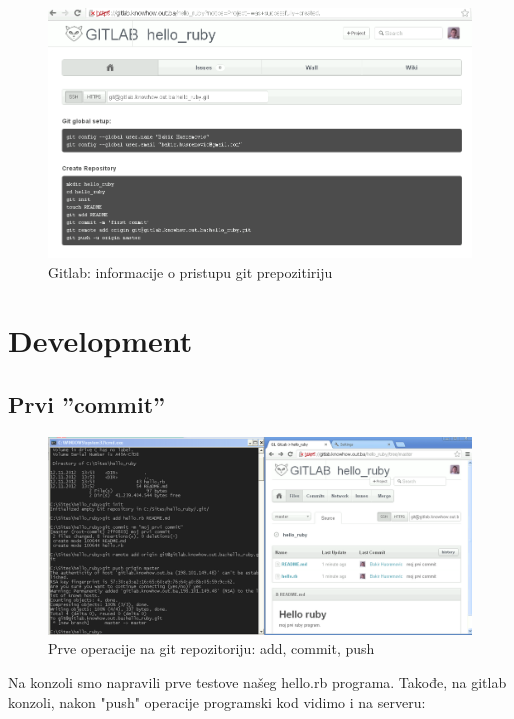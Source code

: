 \documentclass[times, utf8, seminar]{fit}
\begin{document}
\begin{figure}[H]
\centering
\includegraphics[width=15cm]{img/gitlab_new_project_3.png}
\caption{Gitlab: informacije o pristupu git prepozitiriju}
\end{figure}

\section{Development}

\subsection{Prvi ''commit''}

\begin{figure}[H]
\centering
\includegraphics[width=15cm]{img/gitlab_first_commit.png}
\caption{Prve operacije na git repozitoriju: add, commit, push}
\end{figure}


Na konzoli smo napravili prve testove našeg hello.rb programa. Takođe, na gitlab konzoli, nakon "push" operacije programski kod vidimo i na serveru:
\end{document}
